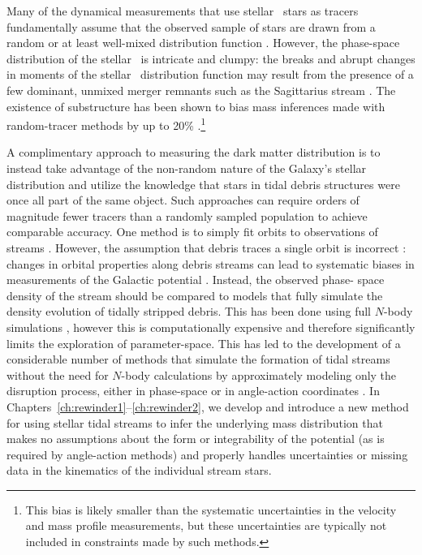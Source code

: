 Many of the dynamical measurements that use stellar \mwhalo\ stars as tracers
fundamentally assume that the observed sample of stars are drawn from a random
or at least well-mixed distribution function \citep[e.g.,][]{todo jeans}.
However, the phase-space distribution of the stellar \mwhalo\ is intricate and
clumpy: the breaks and abrupt changes in moments of the stellar \mwhalo\
distribution function may result from the presence of a few dominant, unmixed
merger remnants such as the Sagittarius stream \citep[which contains almost as
much stellar mass as the rest of the stellar \mwhalo\ combined;][]{todo}. The
existence of substructure has been shown to bias mass inferences made with
random-tracer methods by up to 20\% \citep{yencho06}.\footnote{This bias is
likely smaller than the systematic uncertainties in the velocity and mass
profile measurements, but these uncertainties are typically not included in
constraints made by such methods.}

A complimentary approach to measuring the dark matter distribution is to instead
take advantage of the non-random nature of the Galaxy's stellar distribution and
utilize the knowledge that stars in tidal debris structures were once all part
of the same object. Such approaches can require orders of magnitude fewer
tracers than a randomly sampled population to achieve comparable accuracy. One
method is to simply fit orbits to observations of streams
\citep[e.g.,][]{koposov10}. However, the assumption that debris traces a single
orbit is incorrect \citep[see][]{johnston98,helmi99}: changes in orbital
properties along debris streams can lead to systematic biases in measurements of
the Galactic potential \citep{eyre09a,varghese11}. Instead, the observed phase-
space density of the stream should be compared to models that fully simulate the
density evolution of tidally stripped debris. This has been done using full
$N$-body simulations \citep{todo, law10}, however this is computationally
expensive and therefore significantly limits the exploration of parameter-space.
This has led to the development of a considerable number of methods that
simulate the formation of tidal streams without the need for $N$-body
calculations by approximately modeling only the disruption process, either in
phase-space \citep{varghese11, kuepper12, todo} or in angle-action coordinates
\citep{sanders,todo}. In Chapters~\ref{ch:rewinder1}--\ref{ch:rewinder2}, we
develop and introduce a new method for using stellar tidal streams to infer the
underlying mass distribution that makes no assumptions about the form or
integrability of the potential (as is required by angle-action methods) and
properly handles uncertainties or missing data in the kinematics of the
individual stream stars.

